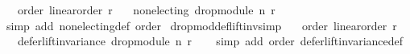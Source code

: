 \begin{isabellebody}
\ \ \ order{\isacharcolon}{\kern0pt}\ {\isachardoublequoteopen}linear{\isacharunderscore}{\kern0pt}order\ r{\isachardoublequoteclose}\isanewline
\ \ \ {\isachardoublequoteopen}non{\isacharunderscore}{\kern0pt}electing\ {\isacharparenleft}{\kern0pt}drop{\isacharunderscore}{\kern0pt}module\ n\ r{\isacharparenright}{\kern0pt}{\isachardoublequoteclose}\isanewline
%
\isadelimproof
\ \ %
\endisadelimproof
%
\isatagproof
{}\isamarkupfalse%
\ {\isacharparenleft}{\kern0pt}simp\ add{\isacharcolon}{\kern0pt}\ non{\isacharunderscore}{\kern0pt}electing{\isacharunderscore}{\kern0pt}def\ order{\isacharparenright}{\kern0pt}%
\endisatagproof
{\isafoldproof}%
%
\isadelimproof
%
\endisadelimproof
%
\isadelimdocument
%
\endisadelimdocument
%
\isatagdocument
%
\isamarkuptrue%
%
\endisatagdocument
{\isafolddocument}%
%
\isadelimdocument
%
\endisadelimdocument
{}\isamarkupfalse%
\ drop{\isacharunderscore}{\kern0pt}mod{\isacharunderscore}{\kern0pt}def{\isacharunderscore}{\kern0pt}lift{\isacharunderscore}{\kern0pt}inv{\isacharbrackleft}{\kern0pt}simp{\isacharbrackright}{\kern0pt}{\isacharcolon}{\kern0pt}\isanewline
\ \ \ order{\isacharcolon}{\kern0pt}\ {\isachardoublequoteopen}linear{\isacharunderscore}{\kern0pt}order\ r{\isachardoublequoteclose}\isanewline
\ \ \ {\isachardoublequoteopen}defer{\isacharunderscore}{\kern0pt}lift{\isacharunderscore}{\kern0pt}invariance\ {\isacharparenleft}{\kern0pt}drop{\isacharunderscore}{\kern0pt}module\ n\ r{\isacharparenright}{\kern0pt}{\isachardoublequoteclose}\isanewline
%
\isadelimproof
\ \ %
\endisadelimproof
%
\isatagproof
{}\isamarkupfalse%
\ {\isacharparenleft}{\kern0pt}simp\ add{\isacharcolon}{\kern0pt}\ order\ defer{\isacharunderscore}{\kern0pt}lift{\isacharunderscore}{\kern0pt}invariance{\isacharunderscore}{\kern0pt}def{\isacharparenright}{\kern0pt}%
\endisatagproof
{\isafoldproof}%
%
\isadelimproof
\isanewline
%
\endisadelimproof
%
\isadelimtheory
\isanewline
%
\endisadelimtheory
%
\isatagtheory
{}\isamarkupfalse%
%
\endisatagtheory
{\isafoldtheory}%
%
\isadelimtheory
%
\endisadelimtheory
%
\end{isabellebody}%
\endinput
